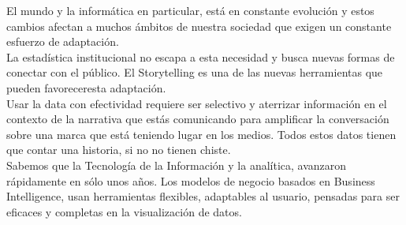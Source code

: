 \documentclass[preprint,12pt]{elsarticle}
\begin{document}
		El mundo y la informática en particular, está en constante evolución y estos cambios afectan a muchos ámbitos de nuestra sociedad que exigen un constante esfuerzo de adaptación.\\

La estadística institucional no escapa a esta necesidad y busca nuevas formas de conectar con el público. El Storytelling es una de las nuevas herramientas que pueden favoreceresta adaptación.\\

Usar la data con efectividad requiere ser selectivo y aterrizar información en el contexto de la narrativa que estás comunicando para amplificar la conversación sobre una marca que está teniendo lugar en los medios. Todos estos datos tienen que contar una historia, si no no tienen chiste. \\

Sabemos que la Tecnología de la Información y la analítica, avanzaron rápidamente en sólo unos años. Los modelos de negocio basados en Business Intelligence, usan herramientas flexibles, adaptables al usuario, pensadas para ser eficaces y completas en la visualización de datos.\\

	

	
	
	\newpage
	
	
	
	
	
	
	
	
	
	
	
	
	
	
\end{document}
